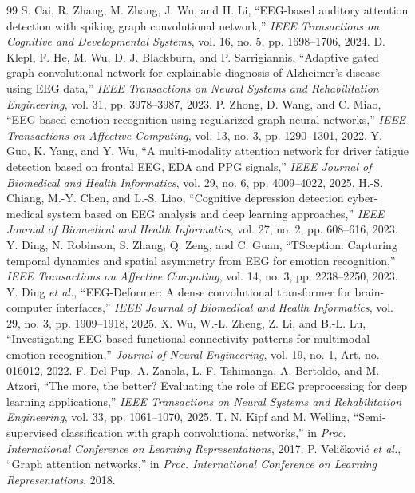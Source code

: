 \documentclass[journal]{IEEEtran}
\begin{document}
\begin{thebibliography}{99}
 S. Cai, R. Zhang, M. Zhang, J. Wu, and H. Li, ``EEG-based auditory attention detection with spiking graph convolutional network,'' \emph{IEEE Transactions on Cognitive and Developmental Systems}, vol. 16, no. 5, pp. 1698--1706, 2024.
 D. Klepl, F. He, M. Wu, D. J. Blackburn, and P. Sarrigiannis, ``Adaptive gated graph convolutional network for explainable diagnosis of Alzheimer's disease using EEG data,'' \emph{IEEE Transactions on Neural Systems and Rehabilitation Engineering}, vol. 31, pp. 3978--3987, 2023.
 P. Zhong, D. Wang, and C. Miao, ``EEG-based emotion recognition using regularized graph neural networks,'' \emph{IEEE Transactions on Affective Computing}, vol. 13, no. 3, pp. 1290--1301, 2022.
 Y. Guo, K. Yang, and Y. Wu, ``A multi-modality attention network for driver fatigue detection based on frontal EEG, EDA and PPG signals,'' \emph{IEEE Journal of Biomedical and Health Informatics}, vol. 29, no. 6, pp. 4009--4022, 2025.
 H.-S. Chiang, M.-Y. Chen, and L.-S. Liao, ``Cognitive depression detection cyber-medical system based on EEG analysis and deep learning approaches,'' \emph{IEEE Journal of Biomedical and Health Informatics}, vol. 27, no. 2, pp. 608--616, 2023.
 Y. Ding, N. Robinson, S. Zhang, Q. Zeng, and C. Guan, ``TSception: Capturing temporal dynamics and spatial asymmetry from EEG for emotion recognition,'' \emph{IEEE Transactions on Affective Computing}, vol. 14, no. 3, pp. 2238--2250, 2023.
 Y. Ding \emph{et al.}, ``EEG-Deformer: A dense convolutional transformer for brain-computer interfaces,'' \emph{IEEE Journal of Biomedical and Health Informatics}, vol. 29, no. 3, pp. 1909--1918, 2025.
 X. Wu, W.-L. Zheng, Z. Li, and B.-L. Lu, ``Investigating EEG-based functional connectivity patterns for multimodal emotion recognition,'' \emph{Journal of Neural Engineering}, vol. 19, no. 1, Art. no. 016012, 2022.
 F. Del Pup, A. Zanola, L. F. Tshimanga, A. Bertoldo, and M. Atzori, ``The more, the better? Evaluating the role of EEG preprocessing for deep learning applications,'' \emph{IEEE Transactions on Neural Systems and Rehabilitation Engineering}, vol. 33, pp. 1061--1070, 2025.
 T. N. Kipf and M. Welling, ``Semi-supervised classification with graph convolutional networks,'' in \emph{Proc. International Conference on Learning Representations}, 2017.
 P. Veli\v{c}kovi\'{c} \emph{et al.}, ``Graph attention networks,'' in \emph{Proc. International Conference on Learning Representations}, 2018.

\end{thebibliography}
\end{document}

